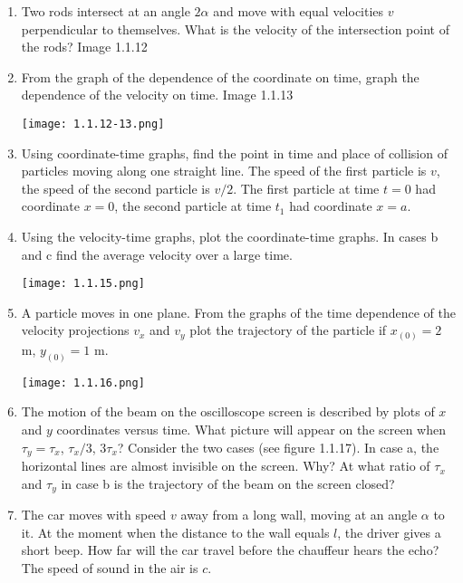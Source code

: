 \documentclass{article}
\begin{document}
\begin{enumerate}[label=1.1.\arabic*]
\item Two rods intersect at an angle $2 \alpha$ and move with equal velocities $v$ perpendicular to themselves. What is the velocity of the intersection point of the rods? Image 1.1.12



\item From the graph of the dependence of the coordinate on time, graph the dependence of the velocity on time. Image 1.1.13
\begin{center}
    \texttt{[image: 1.1.12-13.png]}
\end{center}

\item Using coordinate-time graphs, find the point in time and place of collision of particles moving along one straight line. The speed of the first particle is $v$, the speed of the second particle is $v/2$. The first particle at time $t = 0$ had coordinate $x = 0$, the second particle at time $t_1$ had coordinate $x = a$.

\item Using the velocity-time graphs, plot the coordinate-time graphs. In cases b and c find the average velocity over a large time.
\begin{center}
    \texttt{[image: 1.1.15.png]}
\end{center}

\item A particle moves in one plane. From the graphs of the time dependence of the velocity projections $v_x$ and $v_y$ plot the trajectory of the particle if $x_{(0)} = 2$ m, $y_{(0)} = 1$ m.
\begin{center}
    \texttt{[image: 1.1.16.png]}
\end{center}

\item The motion of the beam on the oscilloscope screen is described by plots of $x$ and $y$ coordinates versus time. What picture will appear on the screen when $\tau_y = \tau_x$, $\tau_x/3$, $3 \tau_x$? Consider the two cases (see figure 1.1.17). In case a, the horizontal lines are almost invisible on the screen. Why? At what ratio of $\tau_x$ and $\tau_y$ in case b is the trajectory of the beam on the screen closed?

\item The car moves with speed $v$ away from a long wall, moving at an angle $\alpha$ to it. At the moment when the distance to the wall equals $l$, the driver gives a short beep. How far will the car travel before the chauffeur hears the echo? The speed of sound in the air is $c$.


\end{enumerate}
\end{document}
